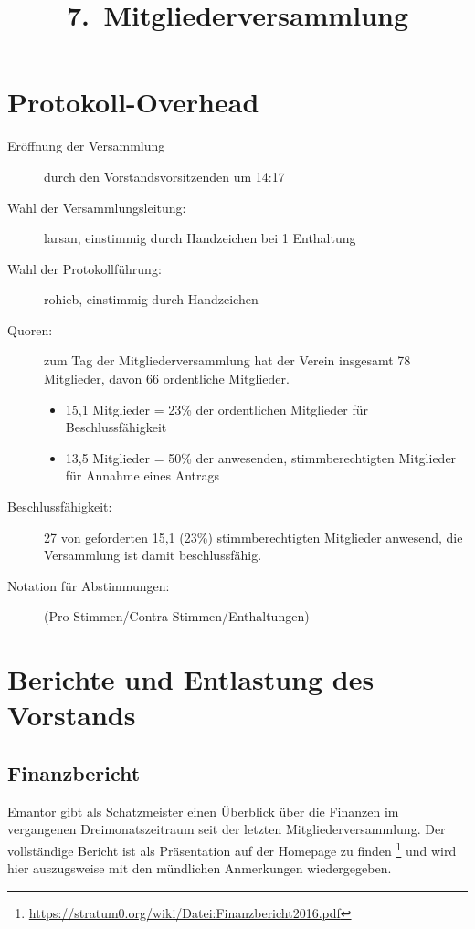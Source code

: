 \documentclass{s0minutes}
\title{7.\, Mitgliederversammlung}
\begin{document}
\maketitle

\section{Protokoll-Overhead}
\begin{description}
  \item[Eröffnung der Versammlung] durch den Vorstandsvorsitzenden um 14:17
  \item[Wahl der Versammlungsleitung:] larsan, einstimmig durch Handzeichen
    bei 1 Enthaltung
  \item[Wahl der Protokollführung:] rohieb, einstimmig durch Handzeichen
  \item[Quoren:] zum Tag der Mitgliederversammlung hat der Verein insgesamt 78
    Mitglieder, davon 66 ordentliche Mitglieder.
    \begin{itemize}
      \item 15{,}1 Mitglieder = 23\% der ordentlichen Mitglieder für
        Beschlussfähigkeit
      \item 13{,}5 Mitglieder = 50\% der anwesenden, stimmberechtigten Mitglieder
        für Annahme eines Antrags
    \end{itemize}
  \item[Beschlussfähigkeit:] 27 von geforderten 15{,}1 (23\%) stimmberechtigten
    Mitglieder anwesend, die Versammlung ist damit beschlussfähig.
  \item[Notation für Abstimmungen:] (Pro-Stimmen/Contra-Stimmen/Enthaltungen)
\end{description}

\section{Berichte und Entlastung des Vorstands}

\subsection{Finanzbericht}

Emantor gibt als Schatzmeister einen Überblick über die Finanzen im
vergangenen Dreimonatszeitraum seit der letzten Mitgliederversammlung. Der
vollständige Bericht ist als Präsentation auf der Homepage zu finden%
\footnote{\url{https://stratum0.org/wiki/Datei:Finanzbericht2016.pdf}}
und wird hier auszugsweise mit den mündlichen Anmerkungen wiedergegeben.
\end{document}

